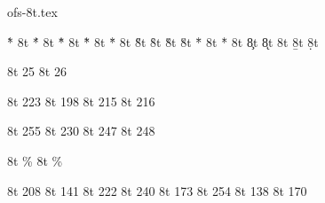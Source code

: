 

\protectreading ofs-8t.tex %



\accentdef  \` *    8t  { }               
\accentdef  \' *    8t  { }
\accentdef  \^ *    8t  { }
\accentdef  \~ *    8t  { }
\accentdef  \" *    8t  { }
\accentdef  \H *    8t  { }
\accentdef  \r *    8t  { }
\accentdef  \v *    8t  { }
\accentdef  \u *    8t  { }
\accentdef  \= *    8t  { }
\accentdef  \. *    8t  { }
\accentdef  \c *    8t  {}
\accentdef  \k *    8t  {}
\accentdef  \m *    8t  {\accentbelow {,}{.1ex}}
\accentdef  \b *    8t  {}
\accentdef  \d *    8t  {}


\def\aa{\r a} 
\def\AA{\r A}

\characterdef \dotlessi    8t  25
\characterdef \dotlessj    8t  26
\let\i=\dotlessi  \let\j=\dotlessj

\let\SS=\relax \let\AE=\relax \let\OE=\relax \let\O=\relax
\characterdef \SS   8t  223
\characterdef \AE   8t  198
\characterdef \OE   8t  215
\characterdef \O    8t  216

\let\ss=\relax \let\ae=\relax \let\oe=\relax \let\o=\relax
\characterdef \ss   8t  255
\characterdef \ae   8t  230
\characterdef \oe   8t  247
\characterdef \o    8t  248


\let\promile=\relax
\characterdef \promile          8t {\% }        
\characterdef \pertenthousand   8t {\% } 

\characterdef \Eth      8t  208
\characterdef \NG       8t  141
\characterdef \Thorn    8t  222
\characterdef \eth      8t  240
\characterdef \ng       8t  173
\characterdef \thorn    8t  254
\characterdef \Lslash   8t  138   \let\L=\Lslash
\characterdef \lslash   8t  170   \let\l=\lslash

